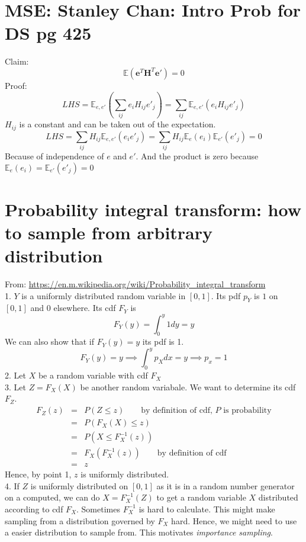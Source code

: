\documentclass{article}
\newcommand{\beq}{\begin{equation}}
\newcommand{\eeq}{\end{equation}}
\newcommand{\ber}{\begin{eqnarray}}
\newcommand{\eer}{\end{eqnarray}}
\begin{document}
\section{MSE: Stanley Chan: Intro Prob for DS pg 425}
Claim:
\beq
\mathbb{E}(\pmb{e}^T\pmb{H}^T\pmb{e}') = 0
\eeq
Proof:
\beq
LHS=\mathbb{E}_{e,e'}(\sum_{ij}e_iH_{ij}{e'}_{j}) = \sum_{ij}\mathbb{E}_{e,e'}(e_iH_{ij}{e'}_{j})
\eeq
$H_{ij}$ is a constant and can be taken out of the expectation.
\beq
LHS = \sum_{ij}H_{ij}\mathbb{E}_{e,e'}(e_i{e'}_{j}) = \sum_{ij}H_{ij}\mathbb{E}_{e}(e_i)\mathbb{E}_{e'}({e'}_j) = 0
\eeq
Because of independence of $e$ and $e'$. And the product is zero because $\mathbb{E}_{e}(e_i)=\mathbb{E}_{e'}({e'}_j)=0$
%
%
%
\section{Probability integral transform: how to sample from arbitrary distribution}
From: \url{https://en.m.wikipedia.org/wiki/Probability_integral_transform}\\
1. $Y$ is a uniformly distributed random variable in $[0,1]$. Its pdf $p_Y$ is $1$ on $[0,1]$ and $0$ elsewhere. Its cdf $F_Y$ is
\beq
F_Y (y) = \int_{0}^y 1 dy = y
\eeq
We can also show that if $F_Y(y)=y$ its pdf is 1.\\
\beq
F_Y(y) = y \implies \int_{0}^y p_X dx  = y \implies p_x = 1
\eeq
2. Let $X$ be a random variable with cdf $F_X$\\
3. Let $Z=F_X(X)$ be another random variabale. We want to determine its cdf $F_Z$.
\ber
F_Z(z) &=& P(Z \le z)  \qquad \text{by definition of cdf, $P$ is probability} \\
&=& P(F_X(X) \le z) \\
&=& P( X \le F_X^{-1}(z))\\
&=& F_X(F_X^{-1}(z)) \qquad \text{by definition of cdf} \\
&=& z
\eer
Hence, by point 1, $z$ is uniformly distributed.\\
4. If $Z$ is uniformly distributed on $[0,1]$ as it is in a random number generator on a computed, we can do $X=F_X^{-1}(Z)$ to get a random variable $X$ distributed according to cdf $F_X$. Sometimes $F_X^{-1}$
is hard to calculate. This might make sampling from a distribution governed by $F_X$ hard. Hence, we might need to use a easier distribution to sample from. This motivates \textit{importance sampling}.
%
%
%
\end{document}
